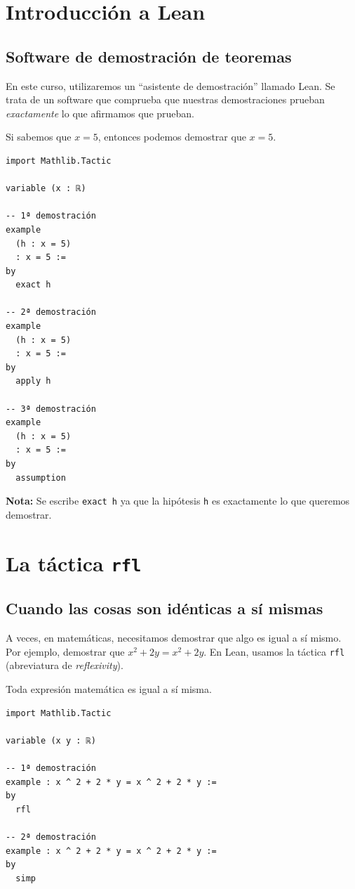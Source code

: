 \section{Introducción a Lean}

\subsection*{Software de demostración de teoremas}

En este curso, utilizaremos un ``asistente de demostración'' llamado
Lean. Se trata de un software que comprueba que nuestras demostraciones
prueban \textit{exactamente} lo que afirmamos que prueban.

\begin{theorem}
Si sabemos que $x = 5$, entonces podemos demostrar que $x = 5$.
\end{theorem}

\begin{verbatim}
import Mathlib.Tactic

variable (x : ℝ)

-- 1ª demostración
example
  (h : x = 5)
  : x = 5 :=
by
  exact h

-- 2ª demostración
example
  (h : x = 5)
  : x = 5 :=
by
  apply h

-- 3ª demostración
example
  (h : x = 5)
  : x = 5 :=
by
  assumption
\end{verbatim}

\textbf{Nota:} Se escribe \texttt{exact h} ya que la hipótesis
\texttt{h} es exactamente lo que queremos demostrar.

\section{La táctica \texttt{rfl}}

\subsection*{Cuando las cosas son idénticas a sí mismas}

A veces, en matemáticas, necesitamos demostrar que algo es igual a sí
mismo. Por ejemplo, demostrar que $x^2 + 2y = x^2 + 2y$. En Lean, usamos
la táctica \texttt{rfl} (abreviatura de \textit{reflexivity}).

\begin{theorem}
Toda expresión matemática es igual a sí misma.
\end{theorem}

\begin{verbatim}
import Mathlib.Tactic

variable (x y : ℝ)

-- 1ª demostración
example : x ^ 2 + 2 * y = x ^ 2 + 2 * y :=
by
  rfl

-- 2ª demostración
example : x ^ 2 + 2 * y = x ^ 2 + 2 * y :=
by
  simp
\end{verbatim}

